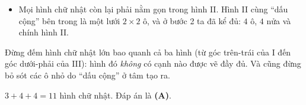 {\begin{itemize}[leftmargin=1.2em,itemsep=1pt,topsep=1pt]
\item Mọi hình chữ nhật còn lại phải nằm gọn trong hình II. Hình II cùng ``dấu cộng'' bên trong là một lưới $2\times2$ ô, và ở bước 2 ta đã kể đủ: $4$ ô, $4$ nửa và chính hình II.
\end{itemize}
\begin{warnbox}Đừng đếm hình chữ nhật lớn bao quanh cả ba hình (từ góc trên-trái của I đến góc dưới-phải của III): hình đó \emph{không} có cạnh nào được vẽ đầy đủ. Và cũng đừng bỏ sót các ô nhỏ do ``dấu cộng'' ở tâm tạo ra.\end{warnbox}
$3+4+4=11$ hình chữ nhật.
Đáp án là \textbf{(A)}.
}
